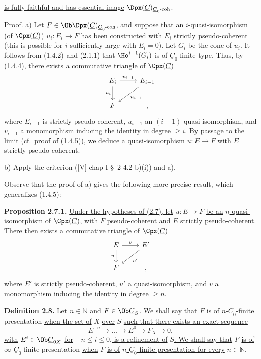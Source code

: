 %
\uline{is fully faithful and has essential image} \(\Dpx(\underline{C})_{\underline{C}_0\text{-}\mathrm{coh}}\).

\uline{Proof.} a) Let \(F\in\Ob\Dpx(\underline{C})_{\underline{C}_0\text{-}\mathrm{coh}}\), and suppose that an \(i\)-quasi-isomorphism (of \(\Cpx(\underline{C})\)) \(u_i:E_i\longrightarrow F\) has been constructed with \(E_i\) strictly pseudo-coherent (this is possible for \(i\) sufficiently large with \(E_i=0\)). Let \(G_i\) be the cone of \(u_i\). It follows from (1.4.2) and (2.1.1) that \(\Ho^{i-1}(G_i)\) is of \(\underline{C}_0\)-finite type. Thus, by (1.4.4), there exists a commutative triangle of \(\Cpx(\underline{C})\)
\[
\begin{tikzcd}
E_i \arrow[r,"v_{i-1}"] \arrow[d,"u_i"'] & E_{i-1} \arrow[dl,"u_{i-1}"]\\
F & ,
\end{tikzcd}
\]
where \(E_{i-1}\) is strictly pseudo-coherent, \(u_{i-1}\) an \((i-1)\)-quasi-isomorphism, and \(v_{i-1}\) a monomorphism inducing the identity in degree \(\geq i\). By passage to the limit (cf.\ proof of (1.4.5)), we deduce a quasi-isomorphism \(u:E\to F\) with \(E\) strictly pseudo-coherent.

b) Apply the criterion ([V] chap I \S\ 2 4.2 b)(i)) and a).

Observe that the proof of a) gives the following more precise result, which generalizes (1.4.5):

\textbf{Proposition 2.7.1.} \uline{Under the hypotheses of (2.7), let} \(u:E\to F\) \uline{be an} \(n\)\uline{-quasi-isomorphism of} \(\Cpx(\underline{C})\)\uline{, with} \(F\) \uline{pseudo-coherent and} \(E\) \uline{strictly pseudo-coherent. There then exists a commutative triangle of} \(\Cpx(\underline{C})\)
\[
\begin{tikzcd}
E \arrow[r,"v"] \arrow[d,"u"'] & E' \arrow[dl,"u'"]\\
F & ,
\end{tikzcd}
\]
\uline{where} \(E'\) \uline{is strictly pseudo-coherent,} \(u'\) \uline{a quasi-isomorphism, and} \(v\) \uline{a}
%
\uline{monomorphism inducing the identity in degree} \(\geq n\).

\textbf{Definition 2.8.} \uline{Let} \(n\in\mathbb N\) \uline{and} \(F\in\Ob\underline{C}_S\)\uline{. We shall say that} \(F\) \uline{is of} \(\underline{n}\)-\(\underline{C}_0\)-finite presentation \uline{when the set of} \(X\) \uline{over} \(S\) \uline{such that there exists an exact sequence}
\[
  E^{-n}\longrightarrow\ldots\longrightarrow E^0\longrightarrow F_X\longrightarrow 0,
\]
\uline{with} \(E^i\in\Ob\underline{C}_{0X}\) \uline{for} \(-n\leq i\leq 0\)\uline{, is a refinement of} \(S\)\uline{. We shall say that} \(F\) \uline{is of} \(\infty\)-\(\underline{C}_0\)-finite presentation \uline{when} \(F\) \uline{is of} \(n\)\uline{-}\(\underline{C}_0\)\uline{-finite presentation for every} \(n\in\mathbb N\).

